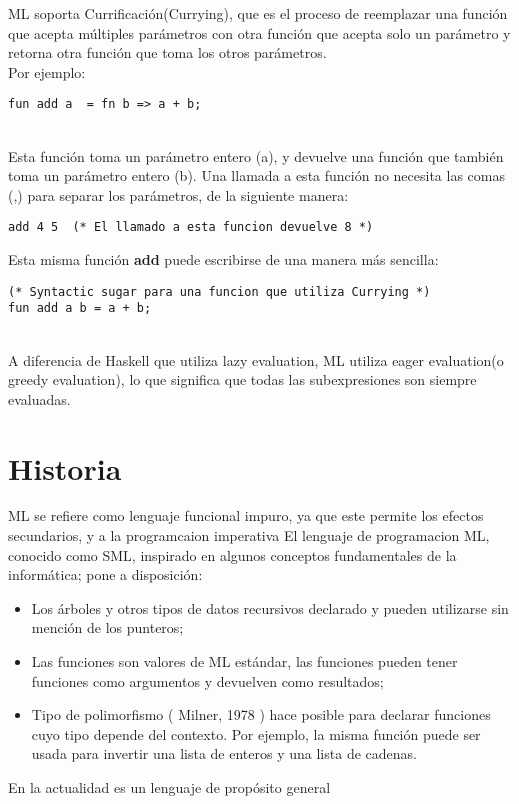 \documentclass[11pt]{article} %
\begin{document}
ML soporta Currificación(Currying), que es el proceso de reemplazar una función que acepta múltiples parámetros con otra función que acepta solo un parámetro y retorna otra función que toma los otros parámetros.\\
Por ejemplo:\\
\begin{lstlisting}[frame=single]
fun add a  = fn b => a + b;
\end{lstlisting}\\

Esta función toma un parámetro entero (a), y devuelve una función que también toma un parámetro entero (b). Una llamada a esta función no necesita las comas (,) para separar los parámetros, de la siguiente manera:\\

\begin{lstlisting}[frame=single]
add 4 5  (* El llamado a esta funcion devuelve 8 *) 
\end{lstlisting}

Esta misma función {\bf add} puede escribirse de una manera más sencilla:\\

\begin{lstlisting}[frame=single]
(* Syntactic sugar para una funcion que utiliza Currying *)
fun add a b = a + b;
\end{lstlisting}\\

A diferencia de Haskell que utiliza lazy evaluation, ML utiliza eager evaluation(o greedy evaluation), lo que significa que todas las subexpresiones son siempre evaluadas.

\section{\color{red}Historia}
ML se refiere como lenguaje funcional impuro, ya que este permite los efectos secundarios,  y a la programcaion imperativa
El lenguaje de programacion ML, conocido como SML, inspirado en algunos conceptos fundamentales de la informática; pone a disposición:
\begin{itemize}
\item Los árboles y otros tipos de datos recursivos declarado y pueden utilizarse sin mención de los punteros;
\item Las funciones son valores de ML estándar, las funciones pueden tener funciones como argumentos y devuelven como resultados;
\item Tipo de polimorfismo ( Milner, 1978 ) hace posible para declarar funciones cuyo tipo depende del contexto. Por ejemplo, la misma función puede ser usada para invertir una lista de enteros y una lista de cadenas.
\end{itemize}
En la actualidad es un lenguaje de propósito general
\end{document}
